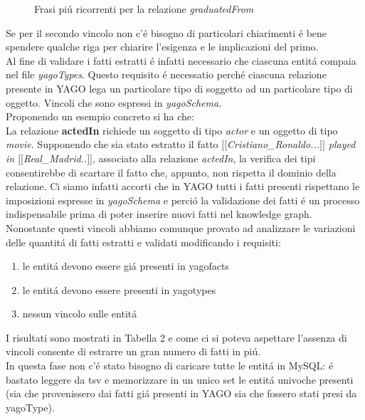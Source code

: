 \documentclass[twocolumn,10pt]{asme2ej}
\begin{document}
\begin{figure} 
\centerline{}
\caption{Frasi pi\'u ricorrenti per la relazione \textit{graduatedFrom}}
\label{step1.ps}
\end{figure}
Se per  il secondo vincolo non c'\'e bisogno di particolari chiarimenti \'e bene spendere qualche riga per chiarire l'esigenza e le implicazioni del primo.
\\Al fine di validare i fatti estratti \'e infatti necessario che ciascuna entit\'a compaia nel file \textit{yagoTypes}. Questo requisito \'e necessatio perch\'e ciascuna relazione presente in YAGO lega un particolare tipo di soggetto ad un particolare tipo di oggetto. Vincoli che sono espressi in \textit{yagoSchema}.\\ Proponendo un esempio concreto si ha che:\\ La relazione \textbf{actedIn} richiede un soggetto di tipo \textit{actor} e un oggetto di tipo \textit{movie}. Supponendo che sia stato estratto il fatto \textit{$[[$Cristiano\_Ronaldo...$]]$ played in $[[$Real\_Madrid..$]]$}, associato alla relazione \textit{actedIn}, la verifica dei tipi consentirebbe di scartare il fatto che, appunto, non rispetta il dominio della relazione. Ci siamo infatti accorti che in YAGO tutti i fatti presenti rispettano le imposizioni espresse in \textit{yagoSchema} e perci\'o la validazione dei fatti \'e un processo indispensabile prima di poter inserire nuovi fatti nel knowledge graph.\\ Nonostante questi vincoli abbiamo comunque provato ad analizzare le variazioni delle quantit\'a di fatti estratti e validati modificando i requisiti:
\begin{enumerate}
\item le entit\'a devono essere gi\'a presenti in yagofacts
\item le entit\'a devono essere presenti in yagotypes
\item nessun vincolo sulle entit\'a
\end{enumerate}
I risultati sono mostrati in Tabella 2 e come ci si poteva  aspettare l'assenza di vincoli consente di estrarre un gran numero di fatti in pi\'u. \\  In questa fase non c'\'e stato bisogno di caricare tutte le entit\'a in MySQL: \'e bastato leggere da tsv e memorizzare in un unico set le entit\'a univoche presenti (sia che provenissero dai fatti gi\'a presenti in YAGO sia che fossero stati presi da yagoType).
\end{document}
